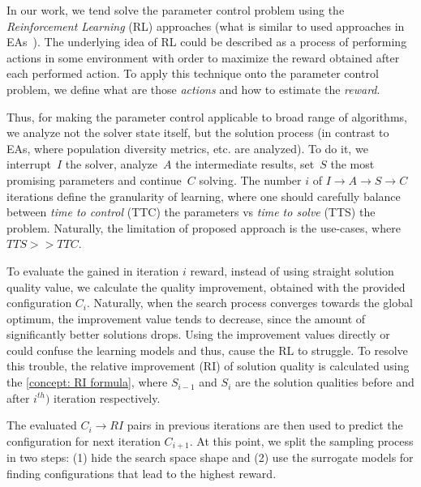 In our work, we tend solve the parameter control problem using the \emph{Reinforcement Learning} (RL) approaches (what is similar to used approaches in EAs~\cite{karafotias2014generic}). 
The underlying idea of RL could be described as a process of performing actions in some environment with order to maximize the reward obtained after each performed action. To apply this technique onto the parameter control problem, we define what are those \emph{actions} and how to estimate the \emph{reward}. 

Thus, for making the parameter control applicable to broad range of algorithms, we analyze not the solver state itself, but the solution process (in contrast to EAs, where population diversity metrics, etc. are analyzed). To do it, we interrupt~$I$ the solver, analyze~$A$ the intermediate results, set~$S$ the most promising parameters and continue~$C$ solving. The number $i$ of $I \rightarrow A \rightarrow S \rightarrow C$ iterations define the granularity of learning, where one should carefully balance between \emph{time to control} (TTC) the parameters vs \emph{time to solve} (TTS) the problem. Naturally, the limitation of proposed approach is the use-cases, where $TTS >> TTC$.


To evaluate the gained in iteration $i$ reward, instead of using straight solution quality value, we calculate the quality improvement, obtained with the provided configuration $C_i$. Naturally, when the search process converges towards the global optimum, the improvement value tends to decrease, since the amount of significantly better solutions drops. Using the improvement values directly or could confuse the learning models and thus, cause the RL to struggle. To resolve this trouble, the relative improvement (RI) of solution quality is calculated using the \cref{concept: RI formula}, where $S_{i-1}$ and $S_i$ are the solution qualities before and after $i^{th})$ iteration respectively.

The evaluated $C_i \rightarrow RI$ pairs in previous iterations are then used to predict the configuration for next iteration $C_{i+1}$. At this point, we split the sampling process in two steps: (1) hide the search space shape and (2) use the surrogate models for finding configurations that lead to the highest reward.



